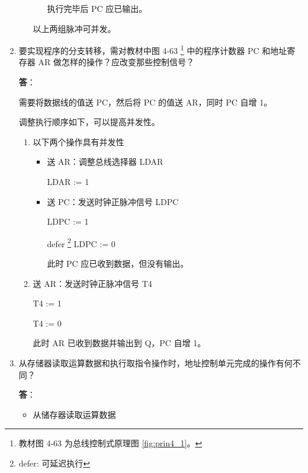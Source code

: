 \begin{enumerate}
\begin{enumerate}
\begin{itemize}
            执行完毕后 PC 应已输出。
            
        \end{itemize}
        
        以上两组脉冲可并发。
        
    \end{enumerate}
    
    \item 要实现程序的分支转移，需对教材中图 4-63 \footnote{教材图 4-63 为总线控制式原理图 \ref{fig:prin4_1}。} 中的程序计数器 PC 和地址寄存器 AR 做怎样的操作？应改变那些控制信号？
    
    \textbf{答}：
    
    需要将数据线的值送 PC，然后将 PC 的值送 AR，同时 PC 自增 1。
    
    调整执行顺序如下，可以提高并发性。
    
    \begin{enumerate}
        \item 以下两个操作具有并发性
        
        \begin{itemize}
            \item 送 AR：调整总线选择器 LDAR
            
            LDAR := 1
            
            \item 送 PC：发送时钟正脉冲信号 LDPC
            
            LDPC := 1
            
            defer \footnote{defer: 可延迟执行} LDPC := 0
            
            此时 PC 应已收到数据，但没有输出。
            
        \end{itemize}

        \item 送 AR：发送时钟正脉冲信号 T4
        
        T4 := 1
        
        T4 := 0
        
        此时 AR 已收到数据并输出到 Q，PC 自增 1。
        
    \end{enumerate}
    
    \item 从存储器读取运算数据和执行取指令操作时，地址控制单元完成的操作有何不同？
    
    \textbf{答}：
    
    \begin{itemize}
        \item 从储存器读取运算数据
        

\end{itemize}
\end{enumerate}
